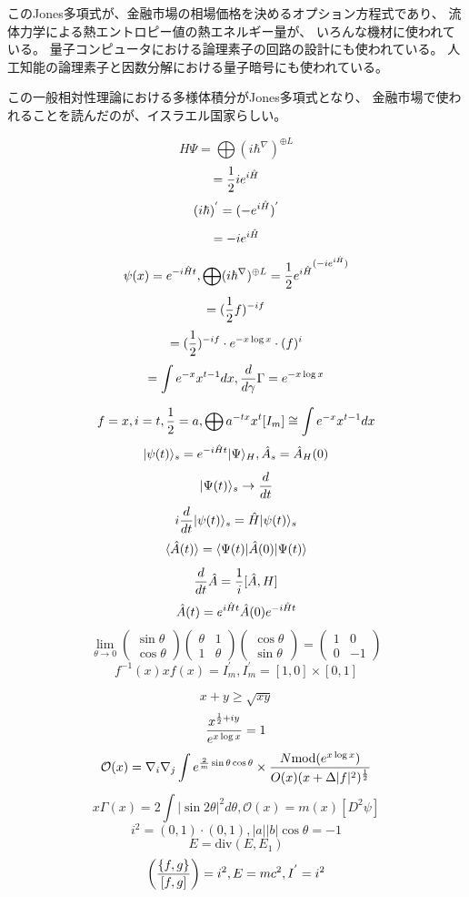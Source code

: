 \documentclass{jsarticle}
\begin{document}
    このJones多項式が、金融市場の相場価格を決めるオプション方程式であり、
    流体力学による熱エントロピー値の熱エネルギー量が、
    いろんな機材に使われている。
    量子コンピュータにおける論理素子の回路の設計にも使われている。
    人工知能の論理素子と因数分解における量子暗号にも使われている。

    この一般相対性理論における多様体積分がJones多項式となり、
    金融市場で使われることを読んだのが、イスラエル国家らしい。

    $$ H\Psi = \bigoplus {\left(i \hbar^{\nabla} \right)}^{\oplus L} $$
    $$ = {1 \over 2}i e^{i \Hat{H}} $$
    $$ (i \hbar)^{'} = (- e^{i \Hat{H}})^{'} $$
    $$ = - i e^{i \Hat{H}} $$
    $$ \psi(x) = e^{-i \Hat{H}t}, \bigoplus (i \hbar ^{\nabla})^{\oplus L} 
    = {{{1 \over 2} e^{i \Hat{H}}}^{(-i e^{i \Hat{H}})}} $$
    $$ = ({1 \over 2}f)^{-i f}$$
    $$ = ({1 \over 2})^{-i f} \cdot e^{-x \log x} \cdot (f)^{i} $$
    $$ = \int e^{- x} x^{t - 1}dx, {d \over d \gamma}\Gamma = e^{-x \log x}  $$
     
    $$ f = x, i = t, {1 \over 2} = a, \bigoplus a^{-t x}x^t [I_m]
     \cong \int e^{-x} x^{t - 1}dx $$
     $$ |\psi(t)\rangle_s = e^{-i\Hat{H} t}|\Psi\rangle_{H},
    \Hat{A}_s = \Hat{A}_H(0) $$
    $$ |\Psi(t)\rangle_s \to {d \over dt} $$
    $$ i {d \over dt}|\psi (t) \rangle_s = \Hat{H}|\psi(t)\rangle_s $$
    $$ \langle\Hat{A}(t)\rangle = \langle\Psi(t)|\Hat{A}(0)|\Psi(t)\rangle  $$
    $$ {d \over dt}\Hat{A} = {1 \over i}[\Hat{A},H] $$
    $$ \Hat{A}(t) = e^{i\Hat{H}t}\Hat{A}(0)e^{-i\Hat{H}t} $$
    $$ \lim_{\theta \to 0} \begin{pmatrix} \sin \theta \\
    \cos \theta \end{pmatrix} \begin{pmatrix} \theta & 1 \\
    1 & \theta \end{pmatrix} \begin{pmatrix} \cos \theta \\
    \sin \theta \end{pmatrix} = \begin{pmatrix} 1 & 0 \\
    0 & - 1 \end{pmatrix} $$
    $$ f^{-1}(x) x f(x) = I^{'}_m, I^{'}_m = [1,0] \times [0,1] $$

    $$ {x + y} \ge \sqrt{x y} $$
    $$ {x^{{1 \over 2} + iy} \over e^{x \log x}} = 1 $$
    $$ \mathcal{O}(x) = \nabla_i \nabla_j \int e^{{2 \over m}\sin \theta 
    \cos \theta } \times {{N \mathrm{mod}(e^{x \log x})} \over {O(x)(x +
    \Delta |f|^2)^{1 \over 2}}} $$
    $$ x \Gamma(x) = 2 \int|\sin 2 \theta|^2 d \theta, \mathcal{O}(x)
    = m(x)[D^2 \psi] $$
    $$ i^2 = (0,1) \cdot (0,1), |a||b|\cos \theta = - 1 $$
    $$ E = \mathrm{div}(E, E_1) $$
    $$ \left({\{f,g\}} \over [f,g] \right) = i^2, E = mc^2, I^{'} = i^2 $$
\end{document}
